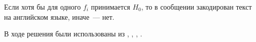 \documentclass[a4paper,10pt]{article}
\begin{document}
Если хотя бы для одного $f_i$ принимается $H_0$, то в сообщении закодирован 
текст на английском языке, иначе~--- нет.

В ходе решения были использованы из \cite{wiki:chi-square}, 
\cite{wiki:pearson},
\cite{wiki:chi-square-qu},
\cite{chernova2006matstat}.




\pagebreak



\end{document}
